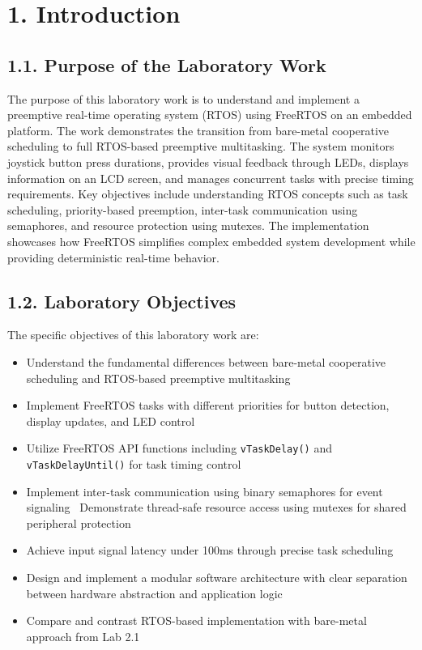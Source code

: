 \documentclass[12pt]{article}
\begin{document}
\setcounter{page}{1}
\pagestyle{fancy}
\fancyhf{}
\rhead{\thepage}

\section*{1. Introduction}

\subsection*{1.1. Purpose of the Laboratory Work}

The purpose of this laboratory work is to understand and implement a preemptive real-time operating system (RTOS) using FreeRTOS on an embedded platform. The work demonstrates the transition from bare-metal cooperative scheduling to full RTOS-based preemptive multitasking. The system monitors joystick button press durations, provides visual feedback through LEDs, displays information on an LCD screen, and manages concurrent tasks with precise timing requirements. Key objectives include understanding RTOS concepts such as task scheduling, priority-based preemption, inter-task communication using semaphores, and resource protection using mutexes. The implementation showcases how FreeRTOS simplifies complex embedded system development while providing deterministic real-time behavior.

\subsection*{1.2. Laboratory Objectives}

The specific objectives of this laboratory work are:

\begin{itemize}
    \item Understand the fundamental differences between bare-metal cooperative scheduling and RTOS-based preemptive multitasking
    \item Implement FreeRTOS tasks with different priorities for button detection, display updates, and LED control
    \item Utilize FreeRTOS API functions including \texttt{vTaskDelay()} and \texttt{vTaskDelayUntil()} for task timing control
    \item Implement inter-task communication using binary semaphores for event signaling
    \ Demonstrate thread-safe resource access using mutexes for shared peripheral protection
    \item Achieve input signal latency under 100ms through precise task scheduling
    \item Design and implement a modular software architecture with clear separation between hardware abstraction and application logic
    \item Compare and contrast RTOS-based implementation with bare-metal approach from Lab 2.1
\end{itemize}
\end{document}
